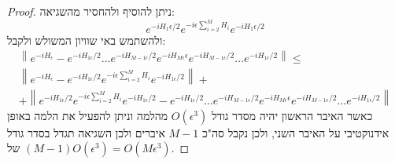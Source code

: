 \documentclass{tstextbook}
\begin{document}
\begin{proof}
ניתן להוסיף ולהחסיר מהשגיאה:
$$e^{-i H_{1}\epsilon/2}e^{-i\epsilon\sum_{i=2}^{M}H_{i}}e^{-i H_{1}\epsilon/2}$$
ולהשתמש באי שוויון המשולש ולקבל:
\begin{gather*}\left\|e^{-iH_{\epsilon}}-e^{-iH_{1\epsilon}/2}\ldots e^{-iH_{M-1\epsilon}/2}e^{-iH_{M\epsilon}\epsilon}e^{-iH_{M-1\epsilon}/2}\ldots e^{-iH_{1\epsilon}/2}\right\|\leq\\\left\|e^{-iH_{\epsilon}}-e^{-iH_{1\epsilon}/2}e^{-i\epsilon\sum\limits_{i=2}^{M}H_{i}}e^{-iH_{1\epsilon}/2}\right\|+\\+\left\|e^{-iH_{1\epsilon}/2}e^{-i\epsilon\sum\limits_{i=2}^{M}H_{i}}e^{-iH_{1\epsilon}/2}-e^{-iH_{1\epsilon}/2}\ldots e^{-iH_{M-1\epsilon}/2}e^{-iH_{M\epsilon}\epsilon}e^{-iH_{M-1\epsilon}/2}\ldots e^{-iH_{1\epsilon}/2}\right\| 
\end{gather*}
כאשר האיבר הראשון יהיה מסדר גודל \(O\left( \epsilon^{3} \right)\) מהלמה וניתן להפעיל את הלמה באופן אידנוקטיבי על האיבר השני, ולכן נקבל סה"כ \(M-1\) איברים ולכן השגיאה תגדל בסדר גודל של \((M-1)O\left( \epsilon^{3} \right)=O\left( M\epsilon^{3} \right)\).

\end{proof}
\end{document}
